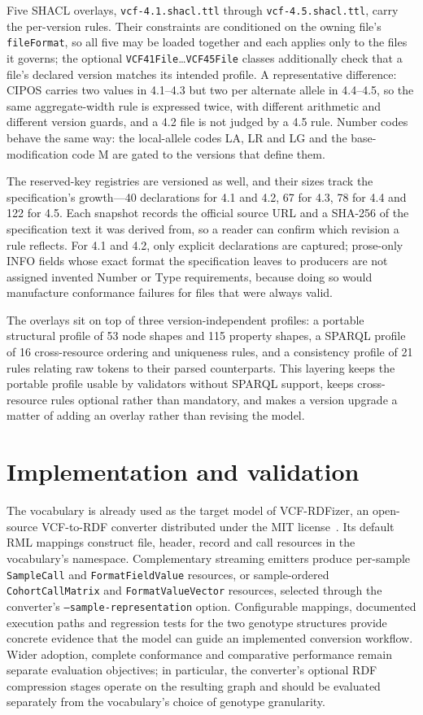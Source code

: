 \documentclass{ceurart}
\newcommand{\term}[1]{\texttt{#1}}
\begin{document}
Five SHACL overlays, \term{vcf-4.1.shacl.ttl} through \term{vcf-4.5.shacl.ttl}, carry the per-version rules. Their constraints are conditioned on the owning file's \term{fileFormat}, so all five may be loaded together and each applies only to the files it governs; the optional \term{VCF41File}\ldots\term{VCF45File} classes additionally check that a file's declared version matches its intended profile. A representative difference: CIPOS carries two values in 4.1--4.3 but two per alternate allele in 4.4--4.5, so the same aggregate-width rule is expressed twice, with different arithmetic and different version guards, and a 4.2 file is not judged by a 4.5 rule. Number codes behave the same way: the local-allele codes LA, LR and LG and the base-modification code M are gated to the versions that define them.

The reserved-key registries are versioned as well, and their sizes track the specification's growth---40 declarations for 4.1 and 4.2, 67 for 4.3, 78 for 4.4 and 122 for 4.5. Each snapshot records the official source URL and a SHA-256 of the specification text it was derived from, so a reader can confirm which revision a rule reflects. For 4.1 and 4.2, only explicit declarations are captured; prose-only INFO fields whose exact format the specification leaves to producers are not assigned invented Number or Type requirements, because doing so would manufacture conformance failures for files that were always valid.

The overlays sit on top of three version-independent profiles: a portable structural profile of 53 node shapes and 115 property shapes, a SPARQL profile of 16 cross-resource ordering and uniqueness rules, and a consistency profile of 21 rules relating raw tokens to their parsed counterparts. This layering keeps the portable profile usable by validators without SPARQL support, keeps cross-resource rules optional rather than mandatory, and makes a version upgrade a matter of adding an overlay rather than revising the model.

\section{Implementation and validation}

The vocabulary is already used as the target model of VCF-RDFizer, an open-source VCF-to-RDF converter distributed under the MIT license~\cite{vcfrConverter2026}. Its default RML mappings construct file, header, record and call resources in the vocabulary's namespace. Complementary streaming emitters produce per-sample \term{SampleCall} and \term{FormatFieldValue} resources, or sample-ordered \term{CohortCallMatrix} and \term{FormatValueVector} resources, selected through the converter's \term{--sample-representation} option. Configurable mappings, documented execution paths and regression tests for the two genotype structures provide concrete evidence that the model can guide an implemented conversion workflow. Wider adoption, complete conformance and comparative performance remain separate evaluation objectives; in particular, the converter's optional RDF compression stages operate on the resulting graph and should be evaluated separately from the vocabulary's choice of genotype granularity.
\end{document}
